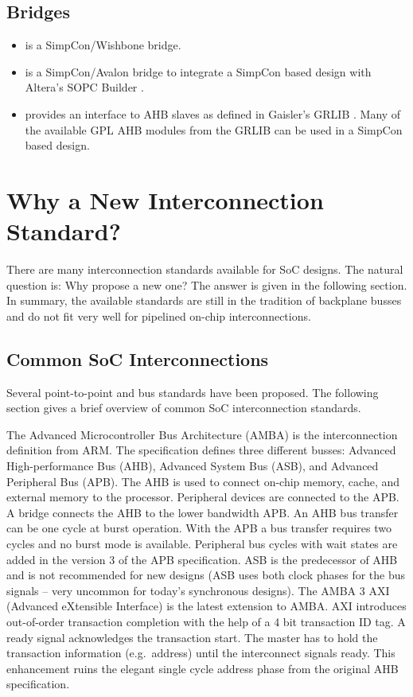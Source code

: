 \subsection{Bridges}

\begin{itemize}
    \item {} is a SimpCon/Wishbone \cite{soc:wishbone}
    bridge.
    \item {} is a SimpCon/Avalon \cite{soc:avalon}
    bridge to integrate a SimpCon based design with Altera's SOPC
    Builder \cite{quartus}.
    \item {} provides an interface to AHB slaves as
    defined in Gaisler's GRLIB \cite{grlib}. Many of the available
    GPL AHB modules from the GRLIB can be used in a SimpCon based
    design.
\end{itemize}


\section{Why a New Interconnection Standard?}

There are many interconnection standards available for SoC designs.
The natural question is: Why propose a new one? The answer is given
in the following section. In summary, the available standards are
still in the tradition of backplane busses and do not fit very well
for pipelined on-chip interconnections.

\subsection{Common SoC Interconnections}


Several point-to-point and bus standards have been proposed. The
following section gives a brief overview of common SoC
interconnection standards.

The Advanced Microcontroller Bus Architecture (AMBA) \cite{soc:amba}
is the interconnection definition from ARM. The specification defines
three different busses: Advanced High-performance Bus (AHB), Advanced
System Bus (ASB), and Advanced Peripheral Bus (APB). The AHB is used
to connect on-chip memory, cache, and external memory to the
processor. Peripheral devices are connected to the APB. A bridge
connects the AHB to the lower bandwidth APB. An AHB bus transfer can
be one cycle at burst operation. With the APB a bus transfer requires
two cycles and no burst mode is available. Peripheral bus cycles with
wait states are added in the version 3 of the APB specification. ASB
is the predecessor of AHB and is not recommended for new designs (ASB
uses both clock phases for the bus signals -- very uncommon for
today's synchronous designs). The AMBA 3 AXI (Advanced eXtensible
Interface) \cite{soc:amba3} is the latest extension to AMBA. AXI
introduces out-of-order transaction completion with the help of a 4
bit transaction ID tag. A ready signal acknowledges the transaction
start. The master has to hold the transaction information (e.g.\
address) until the interconnect signals ready. This enhancement ruins
the elegant single cycle address phase from the original AHB
specification.

